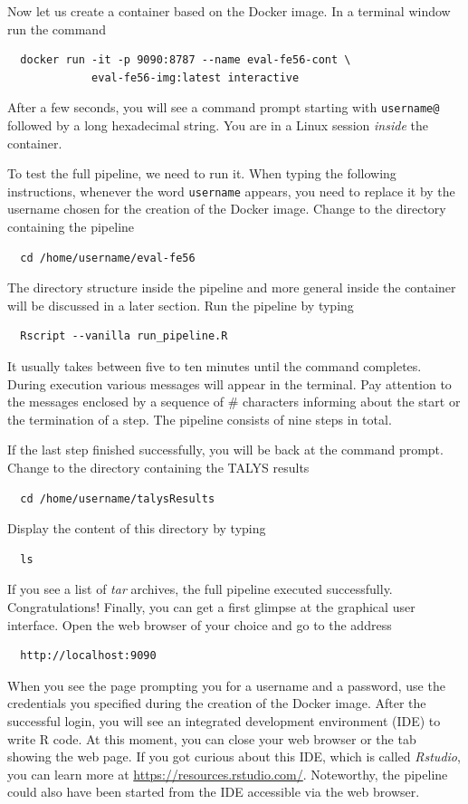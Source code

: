\documentclass[12pt,a4paper]{scrartcl}
\begin{document}
 Now let us create a container based on the Docker image.
 In a terminal window run the command
\begin{verbatim}
  docker run -it -p 9090:8787 --name eval-fe56-cont \
             eval-fe56-img:latest interactive
\end{verbatim}
 After a few seconds, you will see a command prompt starting with \verb#username@# followed by a long hexadecimal string.
 You are in a Linux session \textit{inside} the container.
 
 To test the full pipeline, we need to run it.
 When typing the following instructions, whenever the word \verb#username# appears, you need to replace it by the username chosen for the creation of the Docker image.
 Change to the directory containing the pipeline
\begin{verbatim}
  cd /home/username/eval-fe56
\end{verbatim}
  The directory structure inside the pipeline and more general inside the container will be discussed in a later section.
  Run the pipeline by typing
\begin{verbatim}
  Rscript --vanilla run_pipeline.R
\end{verbatim}
It usually takes between five to ten minutes until the command completes.
During execution various messages will appear in the terminal.
Pay attention to the messages enclosed by a sequence of \# characters informing about the start or the termination of a step.
The pipeline consists of nine steps in total.

If the last step finished successfully, you will be back at the command prompt.
Change to the directory containing the TALYS results
\begin{verbatim}
  cd /home/username/talysResults
\end{verbatim}
Display the content of this directory by typing
\begin{verbatim}
  ls
\end{verbatim}
If you see a list of \textit{tar} archives, the full pipeline executed successfully. Congratulations!
Finally, you can get a first glimpse at the graphical user interface.
Open the web browser of your choice and go to the address
\begin{verbatim}
  http://localhost:9090
\end{verbatim}
When you see the page prompting you for a username and a password,
use the credentials you specified during the creation of the Docker image.
After the successful login, you will see an integrated development environment (IDE) to write R code.
At this moment, you can close your web browser or the tab showing the web page.
If you got curious about this IDE, which is called \textit{Rstudio}, you can learn more at \url{https://resources.rstudio.com/}.
Noteworthy, the pipeline could also have been started from the IDE accessible via the web browser.
\end{document}
